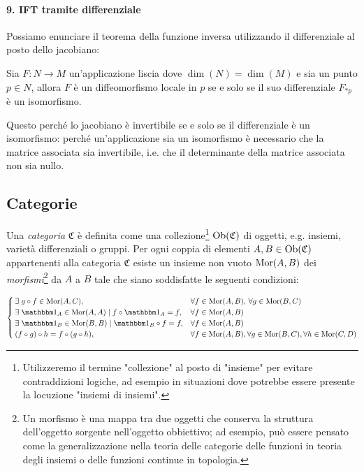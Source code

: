 \paragraph{9. IFT tramite differenziale}

Possiamo enunciare il teorema della funzione inversa utilizzando il differenziale al posto dello jacobiano:

\begin{theorem}\label{thm:diffeo-loc-iso-ift}
	Sia $ F : N \to M $ un'applicazione liscia dove $ \dim(N) = \dim(M) $ e sia un punto $ p \in N $, allora $ F $ è un diffeomorfismo locale in $ p $ se e solo se il suo differenziale $ F_{*p} $ è un isomorfismo.
\end{theorem}

Questo perché lo jacobiano è invertibile se e solo se il differenziale è un isomorfismo: perché un'applicazione sia un isomorfismo è necessario che la matrice associata sia invertibile, i.e. che il determinante della matrice associata non sia nullo.

\subsection{Categorie}

Una \textit{categoria} $ \mathfrak{C} $ è definita come una collezione\footnote{%
	Utilizzeremo il termine "collezione" al posto di "insieme" per evitare contraddizioni logiche, ad esempio in situazioni dove potrebbe essere presente la locuzione "insiemi di insiemi".%
} $ \operatorname{Ob}(\mathfrak{C}) $ di oggetti, e.g. insiemi, varietà differenziali o gruppi. Per ogni coppia di elementi $ A,B \in \operatorname{Ob}(\mathfrak{C}) $ appartenenti alla categoria $ \mathfrak{C} $ esiste un insieme non vuoto $ \operatorname{Mor}(A,B) $ dei \textit{morfismi}\footnote{%
	Un morfismo è una mappa tra due oggetti che conserva la struttura dell'oggetto sorgente nell'oggetto obbiettivo; ad esempio, può essere pensato come la generalizzazione nella teoria delle categorie delle funzioni in teoria degli insiemi o delle funzioni continue in topologia.%
} da $ A $ a $ B $ tale che siano soddisfatte le seguenti condizioni:

\begin{equation}
	\begin{cases}
		\E g \circ f \in \mor(A,C), & \forall f \in \mor(A,B), \, \forall g \in \mor(B,C) \\
		\E \bigone_{A} \in \mor(A,A) \mid f \circ \bigone_{A} = f, & \forall f \in \mor(A,B) \\
		\E \bigone_{B} \in \mor(B,B) \mid \bigone_{B} \circ f = f, & \forall f \in \mor(A,B) \\
		(f \circ g) \circ h = f \circ (g \circ h), & \forall f \in \mor(A,B), \forall g \in \mor(B,C), \forall h \in \mor(C,D)
	\end{cases}
\end{equation}

